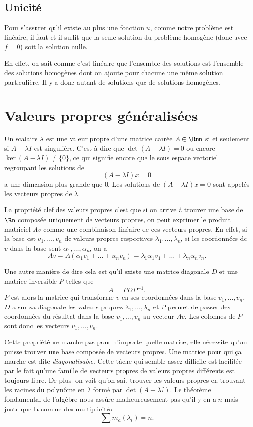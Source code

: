 \subsection{Unicité}
Pour s'assurer qu'il existe au plus une fonction $u$,
comme notre problème est linéaire,
il faut et il suffit que la seule solution
du problème homogène (donc avec $f = 0$)
soit la solution nulle.

En effet,
on sait comme c'est linéaire que l'ensemble des solutions
est l'ensemble des solutions homogènes dont on ajoute
pour chacune une même solution particulière.
Il y a donc autant de solutions que de solutions homogènes.

\annexe

\section{Valeurs propres généralisées}
\label{ann:vpg}
Un scalaire $\lambda$ est une valeur propre d'une matrice carrée $A \in \Rnn$
si et seulement si $A - \lambda I$ est singulière.
C'est à dire que $\det(A-\lambda I) = 0$ ou encore
$\ker(A - \lambda I) \neq \{0\}$, ce qui signifie encore que
le sous espace vectoriel regroupant les solutions de
\[ (A - \lambda I)x = 0 \]
a une dimension plus grande que 0.
Les solutions de $(A - \lambda I)x = 0$ sont appelés les vecteurs propres
de $\lambda$.

La propriété clef des valeurs propres c'est que si on arrive
à trouver une base de $\Rn$ composée uniquement de vecteurs propres,
on peut exprimer le produit matriciel $Av$ comme une combinaison linéaire
de ces vecteurs propres.
En effet, si la base est $v_1, \dots, v_n$ de valeurs propres respectives
$\lambda_1, \dots, \lambda_n$,
si les coordonnées de $v$ dans la base sont $\alpha_1, \dots, \alpha_n$,
on a
\[ Av = A(\alpha_1v_1 + \dots + \alpha_nv_n) =
\lambda_1\alpha_1v_1 + \dots + \lambda_n\alpha_nv_n. \]

Une autre manière de dire cela est qu'il existe une matrice
diagonale $D$ et une matrice inversible $P$ telles que
\[ A = PDP^{-1}. \]
$P$ est alors la matrice qui transforme $v$ en ses coordonnées dans
la base $v_1, \dots, v_n$, $D$ a sur sa diagonale les valeurs propres
$\lambda_1, \dots, \lambda_n$ et $P$ permet de passer des coordonnées
du résultat dans la base $v_1, \dots, v_n$ au vecteur $Av$.
Les colonnes de $P$ sont donc les vecteurs $v_1, \dots, v_n$.

Cette propriété ne marche pas pour n'importe quelle matrice,
elle nécessite qu'on puisse trouver une base composée de vecteurs propres.
Une matrice pour qui ça marche est dite \emph{diagonalisable}.
Cette tâche qui semble assez difficile est facilitée par le fait qu'une
famille de vecteurs propres de valeurs propres différents est toujours
libre.
De plus, on voit qu'on sait trouver les valeurs propres en trouvant les
racines du polynôme en $\lambda$ formé par $\det(A - \lambda I)$.
Le théorème fondamental de l'algèbre nous assûre malheureusement
pas qu'il y en a $n$ mais juste que la somme des multiplicités
\[ \sum m_a(\lambda_i) = n. \]

